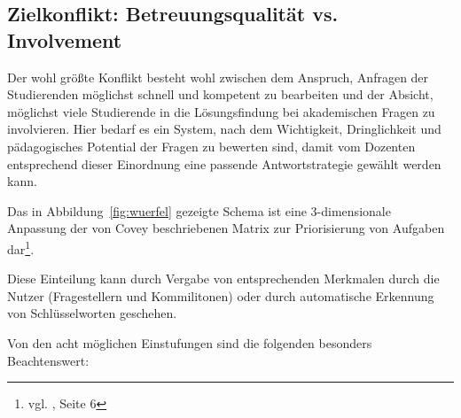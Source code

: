 \subsection{Zielkonflikt: Betreuungsqualität vs. Involvement} %
\label{sub:zielkonflikt_betreuungsqualitat_vs_involvement}
Der wohl größte Konflikt besteht wohl zwischen dem Anspruch, Anfragen der Studierenden möglichst schnell und kompetent zu bearbeiten und der Absicht, möglichst viele Studierende in die Lösungsfindung bei akademischen Fragen zu involvieren. Hier bedarf es ein System, nach dem Wichtigkeit, Dringlichkeit und pädagogisches Potential der Fragen zu bewerten sind, damit vom Dozenten entsprechend dieser Einordnung eine passende Antwortstrategie gewählt werden kann. 

Das in Abbildung~\ref{fig:wuerfel} gezeigte Schema ist eine 3-dimensionale Anpassung der von Covey beschriebenen Matrix zur Priorisierung von Aufgaben dar\footnote{vgl. \cite{covey}, Seite 6}.


Diese Einteilung kann durch Vergabe von entsprechenden Merkmalen durch die Nutzer (Fragestellern und Kommilitonen) oder durch automatische Erkennung von Schlüsselworten geschehen.

Von den acht möglichen Einstufungen sind die folgenden besonders Beachtenswert:

